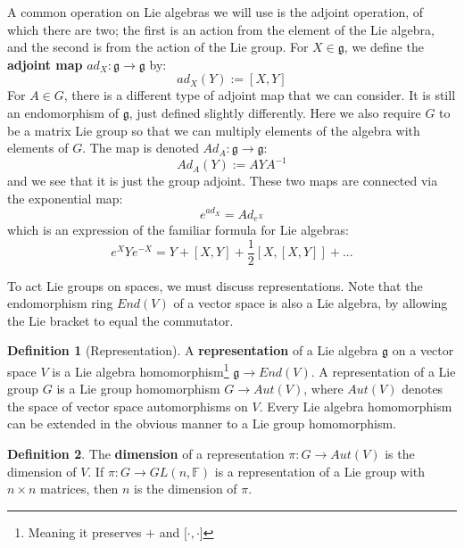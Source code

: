 \documentclass[11pt, oneside]{article}   	%
\theoremstyle{definition}
\newtheorem{definition}{Definition}[section]
\begin{document}
A common operation on Lie algebras we will use is the adjoint operation, of which there are two; the 
first is an action from the element of the Lie algebra, and the second is from the action of the Lie group. 
For $X\in\mathfrak g$, we define the \textbf{adjoint map} $ad_X : \mathfrak g\rightarrow\mathfrak g$ by:
\begin{equation}
	ad_X(Y) := [X, Y]
\end{equation}
For $A\in G$, there is a different type of adjoint map that we can consider. It is still an endomorphism of 
$\mathfrak g$, just defined slightly differently. Here we also require $G$ to be a matrix Lie group so that 
we can multiply elements of the algebra with elements of $G$. The map is denoted $Ad_A : \mathfrak g
\rightarrow\mathfrak g$:
\begin{equation}
	Ad_A(Y) := AYA^{-1}
\end{equation}
and we see that it is just the group adjoint. These two maps are connected via the exponential map:
\begin{equation}
	e^{ad_X} = Ad_{e^{X}}
\end{equation}
which is an expression of the familiar formula for Lie algebras:
\begin{equation}
	e^{X} Y e^{-X} = Y + [X, Y] + \frac{1}{2}[X, [X, Y]] + ...
\end{equation}

To act Lie groups on spaces, we must discuss representations. Note that the endomorphism ring 
$End(V)$ of a vector space is also a Lie algebra, by allowing the Lie bracket to equal the 
commutator.
\begin{definition}[Representation]
	A \textbf{representation} of a Lie algebra $\mathfrak g$ on a vector space $V$ is a Lie 
	algebra homomorphism\footnote{Meaning it preserves $+$ and $[\cdot, \cdot$]}  
	$\mathfrak g\rightarrow End(V)$. A representation of a Lie group $G$ is a Lie group 
	homomorphism $G\rightarrow Aut(V)$, where $Aut(V)$ denotes the space of vector space 
	automorphisms on $V$. Every Lie algebra homomorphism can be extended in the 
	obvious manner to a Lie group homomorphism.
\end{definition}

\begin{definition}
	The \textbf{dimension} of a representation $\pi : G\rightarrow Aut(V)$ is the dimension of $V$. 
	If $\pi : G\rightarrow GL(n, \mathbb F)$ is a representation of a Lie group with $n\times n$ matrices, 
	then $n$ is the dimension of $\pi$. 
\end{definition}
\end{document}
